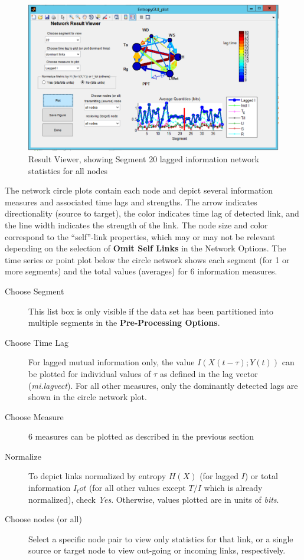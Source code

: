 \documentclass[a4paper]{article}
\begin{document}
\begin{figure}[h!]\label{fig:plotdata}
\begin{center}
\includegraphics[scale=.5]{Image_PlotResults.pdf}
\caption{Result Viewer, showing Segment 20 lagged information network statistics for all nodes}
\end{center}
\end{figure}

The network circle plots contain each node and depict several information measures and associated time lags and strengths.  The arrow indicates directionality (source to target), the color indicates time lag of detected link, and the line width indicates the strength of the link.  The node size and color correspond to the ``self''-link properties, which may or may not be relevant depending on the selection of \textbf{Omit Self Links} in the Network Options.   The time series or point plot below the circle network shows each segment (for 1 or more segments) and the total values (averages) for 6 information measures.

\begin{description}
\item[Choose Segment] This list box is only visible if the data set has been partitioned into multiple segments in the \textbf{Pre-Processing Options}.
\item[Choose Time Lag] For lagged mutual information only, the value $I(X(t-\tau);Y(t))$ can be plotted for individual values of $\tau$ as defined in the lag vector (\textit{mi.lagvect}).  For all other measures, only the dominantly detected lags are shown in the circle network plot.
\item[Choose Measure]  6 measures can be plotted as described in the previous section
\item[Normalize]  To depict links normalized by entropy $H(X)$ (for lagged $I$) or total information $I_tot$ (for all other values except $T/I$ which is already normalized), check \textit{Yes}.  Otherwise, values plotted are in units of \textit{bits}.
\item[Choose nodes (or all)] Select a specific node pair to view only statistics for that link, or a single source or target node to view out-going or incoming links, respectively.
\end{description}


\end{document}
